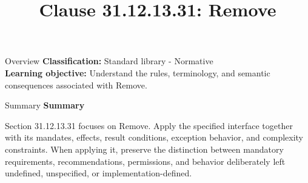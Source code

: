 \documentclass[10pt,letterpaper]{article}
\title{Clause 31.12.13.31: Remove}
\author{}
\date{}
\begin{document}
\maketitle
\begin{CornellOverviewBox}{Overview}
\textbf{Classification:} Standard library - Normative\\[2pt]
\textbf{Learning objective:} Understand the rules, terminology, and semantic consequences associated with Remove.
\end{CornellOverviewBox}\begin{CornellSummaryBox}{Summary}
{\sffamily\bfseries\color{Accent} Summary}\par\vspace{3pt}Section 31.12.13.31 focuses on Remove. Apply the specified interface together with its mandates, effects, result conditions, exception behavior, and complexity constraints. When applying it, preserve the distinction between mandatory requirements, recommendations, permissions, and behavior deliberately left undefined, unspecified, or implementation-defined.
\end{CornellSummaryBox}
\end{document}
